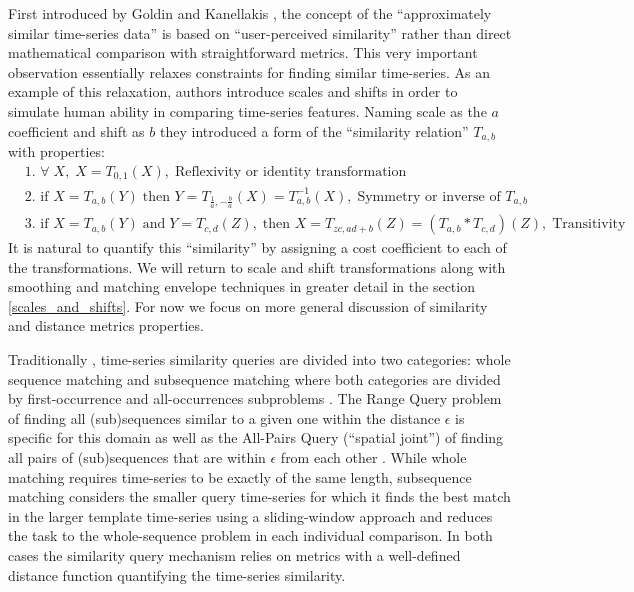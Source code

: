 First introduced by Goldin and Kanellakis \cite{citeulike:3815880}, the concept of the ``approximately similar time-series data'' is based on ``user-perceived similarity'' rather than direct mathematical comparison with straightforward metrics. This very important observation essentially relaxes constraints for finding similar time-series. As an example of this relaxation, authors introduce scales and shifts in order to simulate human ability in comparing time-series features. Naming scale as the $a$ coefficient and shift as $b$ they introduced a form of the ``similarity relation'' $T_{a,b}$ with properties:
\begin{align}
 & \text{1. } \forall \; X, \; X=T_{0,1}(X), \; \text{Reflexivity or identity transformation} \\
 & \text{2. } \text{if } X=T_{a,b}(Y) \; \text{then } Y=T_{\frac{1}{a},-\frac{b}{a}}(X) = T^{-1}_{a,b}(X), \; \text{Symmetry or inverse of $T_{a,b}$} \\
 & \text{3. } \text{if } X=T_{a,b}(Y) \; \text{and} \; Y=T_{c,d}(Z), \; \text{then } X=T_{zc, ad+b}(Z) = (T_{a,b} * T_{c,d})(Z), \; \text{Transitivity}
\end{align}
It is natural to quantify this ``similarity'' by assigning a cost coefficient to each of the transformations. We will return to scale and shift transformations along with smoothing and matching envelope techniques in greater detail in the section \ref{scales_and_shifts}. For now we focus on more general discussion of similarity and distance metrics properties.

Traditionally \cite{citeulike:3973409}, time-series similarity queries are divided into two categories: whole sequence matching and subsequence matching where both categories are divided by first-occurrence and all-occurrences subproblems \cite{citeulike:3815880}. The Range Query problem of finding all (sub)sequences similar to a given one within the distance $\epsilon$ is specific for this domain as well as the All-Pairs Query (``spatial joint'') of finding all pairs of (sub)sequences that are within $\epsilon$ from each other \cite{citeulike:3973409}. While whole matching requires time-series to be exactly of the same length, subsequence matching considers the smaller query time-series for which it finds the best match in the larger template time-series using a sliding-window approach and reduces the task to the whole-sequence problem in each individual comparison. In both cases the similarity query mechanism relies on metrics with a well-defined distance function quantifying the time-series similarity. 

